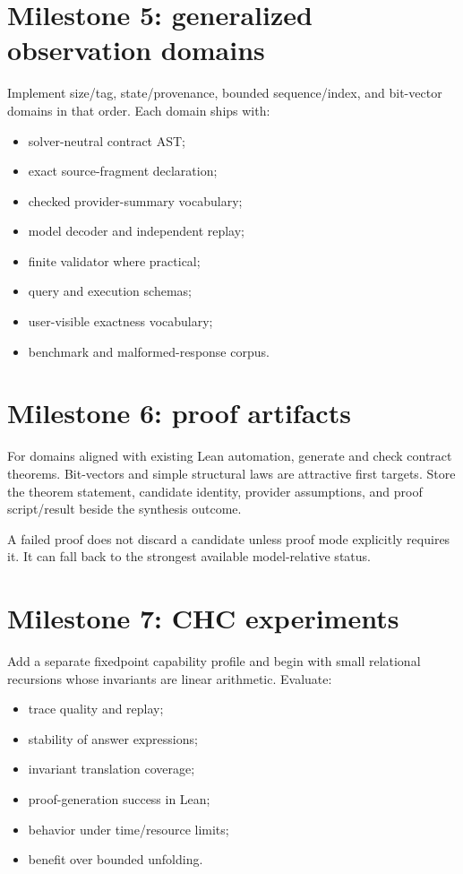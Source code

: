 \documentclass[10pt,letterpaper,oneside]{report}
\begin{document}
\section{Milestone 5: generalized observation domains}

Implement size/tag, state/provenance, bounded sequence/index, and bit-vector domains in that order. Each domain ships with:

\begin{itemize}
\item solver-neutral contract AST;
\item exact source-fragment declaration;
\item checked provider-summary vocabulary;
\item model decoder and independent replay;
\item finite validator where practical;
\item query and execution schemas;
\item user-visible exactness vocabulary;
\item benchmark and malformed-response corpus.
\end{itemize}

\section{Milestone 6: proof artifacts}

For domains aligned with existing Lean automation, generate and check contract theorems. Bit-vectors and simple structural laws are attractive first targets. Store the theorem statement, candidate identity, provider assumptions, and proof script/result beside the synthesis outcome.

A failed proof does not discard a candidate unless proof mode explicitly requires it. It can fall back to the strongest available model-relative status.

\section{Milestone 7: CHC experiments}

Add a separate fixedpoint capability profile and begin with small relational recursions whose invariants are linear arithmetic. Evaluate:

\begin{itemize}
\item trace quality and replay;
\item stability of answer expressions;
\item invariant translation coverage;
\item proof-generation success in Lean;
\item behavior under time/resource limits;
\item benefit over bounded unfolding.
\end{itemize}
\end{document}
